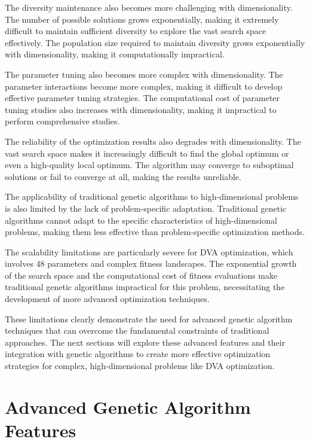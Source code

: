 \documentclass[12pt,a4paper]{article}
\begin{document}
The diversity maintenance also becomes more challenging with dimensionality. The number of possible solutions grows exponentially, making it extremely difficult to maintain sufficient diversity to explore the vast search space effectively. The population size required to maintain diversity grows exponentially with dimensionality, making it computationally impractical.

The parameter tuning also becomes more complex with dimensionality. The parameter interactions become more complex, making it difficult to develop effective parameter tuning strategies. The computational cost of parameter tuning studies also increases with dimensionality, making it impractical to perform comprehensive studies.

The reliability of the optimization results also degrades with dimensionality. The vast search space makes it increasingly difficult to find the global optimum or even a high-quality local optimum. The algorithm may converge to suboptimal solutions or fail to converge at all, making the results unreliable.

The applicability of traditional genetic algorithms to high-dimensional problems is also limited by the lack of problem-specific adaptation. Traditional genetic algorithms cannot adapt to the specific characteristics of high-dimensional problems, making them less effective than problem-specific optimization methods.

The scalability limitations are particularly severe for DVA optimization, which involves 48 parameters and complex fitness landscapes. The exponential growth of the search space and the computational cost of fitness evaluations make traditional genetic algorithms impractical for this problem, necessitating the development of more advanced optimization techniques.

These limitations clearly demonstrate the need for advanced genetic algorithm techniques that can overcome the fundamental constraints of traditional approaches. The next sections will explore these advanced features and their integration with genetic algorithms to create more effective optimization strategies for complex, high-dimensional problems like DVA optimization.





\section{Advanced Genetic Algorithm Features}
\end{document}
